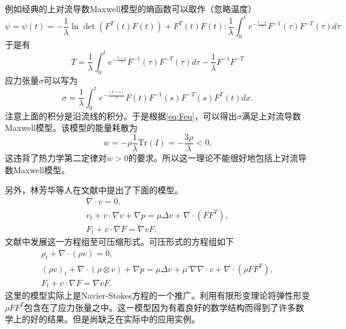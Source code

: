 例如经典的上对流导数Maxwell模型的熵函数可以取作（忽略温度）
\begin{equation*}
	\psi  = \psi(t) = - \frac{1}{\lambda}  \ln \det (F^T(t) F(t)) + F^T(t) F(t) : \frac{1}{\lambda}  \int_{0}^t e^{-\frac{t-s}{\tau}} F^{-1}(\tau) F^{-T}(\tau) d\tau 
\end{equation*}
于是有
\begin{equation*}
	T = \frac{1}{\lambda}  \int_{0}^t e^{-\frac{t-s}{\tau}} F^{-1}(\tau) F^{-T}(\tau) d\tau -\frac{1}{\lambda}  F^{-1} F^{-T} 
\end{equation*}
应力张量$\sigma$可以写为
\begin{equation*}
	\sigma = \frac{1}{\lambda} \int_{0}^{t} e^{-\frac{(t-s)}{\lambda} } F(t)  F^{-1}(s) F^{-T}(s) F^T(t)  dx.
\end{equation*}
注意上面的积分是沿流线的积分。于是根据\eqref{eq:Feq}，可以得出$\sigma$满足上对流导数Maxwell模型。该模型的能量耗散为
\begin{equation*}
	w = - \rho \frac{1}{\lambda} \mbox{Tr}(I) = -\frac{3\rho}{\lambda} < 0.
\end{equation*}
这违背了热力学第二定律对$w>0$的要求。所以这一理论不能很好地包括上对流导数Maxwell模型。


另外，林芳华等人在文献\cite{lin2005hydrodynamics}中提出了下面的模型。
\begin{subequations}\label{eq:linincompressible}
	\begin{align}
		\nabla \cdot v = 0, \\
		v_t + v \cdot \nabla v + \nabla p = \mu \Delta v + \nabla \cdot( F F^T), \\
		F_t + v \cdot \nabla F = \nabla v F.
	\end{align}
\end{subequations}
文献\cite{liu2008global}中发展这一方程组至可压缩形式。可压形式的方程组如下
\begin{subequations}\label{eq:lincompressible}
	\begin{align}
		\rho_t + \nabla \cdot (\rho v) = 0, \\
		(\rho v)_t + \nabla \cdot (\rho\otimes v) + \nabla p = \mu \Delta v + \mu' \nabla \nabla \cdot v+ \nabla \cdot( \rho F F^T), \\
		F_t + v \cdot \nabla F = \nabla v F.
	\end{align}
\end{subequations}
这里的模型实际上是Navier-Stokes方程的一个推广。利用有限形变理论将弹性形变$\rho F F^T$包含在了应力张量之中。这一模型因为有着良好的数学结构而得到了许多数学上的好的结果\cite{lin2012some}。但是尚缺乏在实际中的应用实例。

